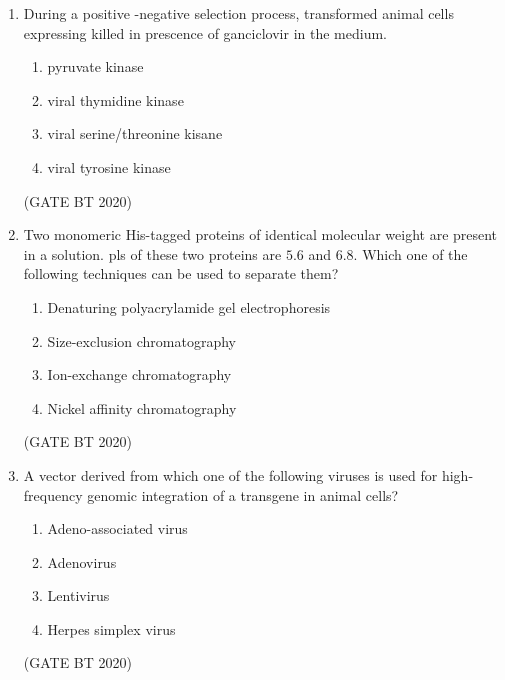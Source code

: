 \documentclass[journal,12pt,onecolumn]{IEEEtran}
\theoremstyle{remark}
\begin{document}
\begin{enumerate}[label=Q\arabic*:]
\begin{multicols}{2}
\begin{enumerate}
\end{enumerate}
\end{multicols}
\hfill(GATE BT 2020)

\item During a positive -negative selection process, transformed animal cells expressing killed in prescence of ganciclovir in the medium.
\begin{multicols}{2}
\begin{enumerate}
\item\;pyruvate kinase
\item\;viral thymidine kinase
\item\;viral serine/threonine kisane  
\item\;viral tyrosine kinase

\end{enumerate}
\end{multicols}\hfill(GATE BT 2020)

\item Two monomeric His-tagged proteins of identical molecular weight are present in a solution. pls of these two proteins are $5.6$ and $6.8$. Which one of the following
techniques can be used to separate them?
\begin{multicols}{2}
\begin{enumerate}

\item\;Denaturing polyacrylamide gel electrophoresis 
\item\;Size-exclusion chromatography
\item\;Ion-exchange chromatography
\item\;Nickel affinity chromatography

\end{enumerate}
\end{multicols}\hfill(GATE BT 2020)

\item A vector derived from which one of the following viruses is used for high-
frequency genomic integration of a transgene in animal cells?
\begin{multicols}{2}
\begin{enumerate}

 \item\;Adeno-associated virus
 \item\;Adenovirus
 \item\;Lentivirus
 \item\;Herpes simplex virus

\end{enumerate} 
 \end{multicols}
\hfill(GATE BT 2020)


\end{enumerate}
\end{document}
